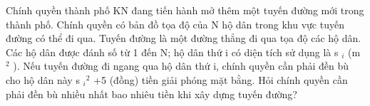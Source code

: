 Chính quyền thành phố KN đang tiến hành mở thêm một tuyến đường mới trong thành phố. Chính quyền có bản đồ tọa độ của N hộ dân trong khu vực tuyến đường có thể đi qua. Tuyến đường là một đường thẳng đi qua tọa độ các hộ dân. Các hộ dân được đánh số từ 1 đến N; hộ dân thứ i có diện tích sử dụng là s   $_    i   $   (m   $^    2   $   ). Nếu tuyến đường đi ngang qua hộ dân thứ i, chính quyền cần phải đền bù cho hộ dân này s   $_    i   $$^    2   $   +5 (đồng) tiền giải phóng mặt bằng. Hỏi chính quyền cần phải đền bù nhiều nhất bao nhiêu tiền khi xây dựng tuyến đường?  

\